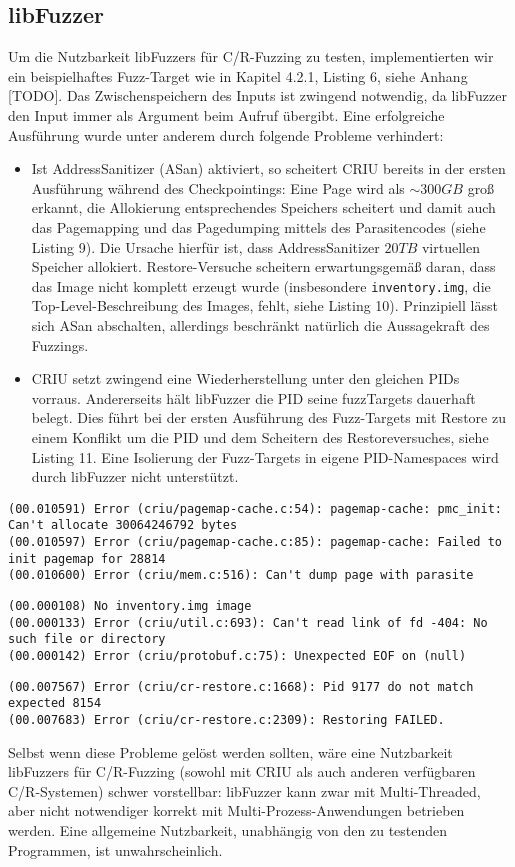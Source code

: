 \documentclass[a4paper]{article}
\begin{document}
\subsection{libFuzzer} %
Um die Nutzbarkeit libFuzzers für C/R-Fuzzing zu testen, implementierten wir ein beispielhaftes Fuzz-Target wie in Kapitel 4.2.1, Listing 6, siehe Anhang [TODO].
Das Zwischenspeichern des Inputs ist zwingend notwendig, da libFuzzer den Input immer als Argument beim Aufruf übergibt. 
Eine erfolgreiche Ausführung wurde unter anderem durch folgende Probleme verhindert:
\begin{itemize}
    \item Ist AddressSanitizer\cite{adsan} (ASan) aktiviert, so scheitert CRIU bereits in der ersten Ausführung während des Checkpointings: Eine Page wird als $\sim 300GB$ groß erkannt, die Allokierung entsprechendes Speichers scheitert und damit auch das Pagemapping und das Pagedumping mittels des Parasitencodes (siehe Listing 9). 
        Die Ursache hierfür ist, dass AddressSanitizer $20TB$ virtuellen Speicher allokiert\cite{aflasan}. Restore-Versuche scheitern erwartungsgemäß daran, dass das Image nicht komplett erzeugt wurde (insbesondere \texttt{inventory.img}, die Top-Level-Beschreibung des Images, fehlt, siehe Listing 10).
        Prinzipiell lässt sich ASan abschalten, allerdings beschränkt natürlich die Aussagekraft des Fuzzings.
    \item CRIU setzt zwingend eine Wiederherstellung unter den gleichen PIDs vorraus. Andererseits hält libFuzzer die PID seine fuzzTargets dauerhaft belegt. Dies führt bei der ersten Ausführung des Fuzz-Targets mit Restore zu einem Konflikt um die PID und dem Scheitern des Restoreversuches, siehe Listing 11. Eine Isolierung der Fuzz-Targets in eigene PID-Namespaces wird durch libFuzzer nicht unterstützt.
\end{itemize}
\begin{lstlisting}[caption=Pagemapping/dumping Errors mit ASan]
(00.010591) Error (criu/pagemap-cache.c:54): pagemap-cache: pmc_init: Can't allocate 30064246792 bytes
(00.010597) Error (criu/pagemap-cache.c:85): pagemap-cache: Failed to init pagemap for 28814
(00.010600) Error (criu/mem.c:516): Can't dump page with parasite
\end{lstlisting}
\begin{lstlisting}[caption=Restoring Error mit ASan]
(00.000108) No inventory.img image
(00.000133) Error (criu/util.c:693): Can't read link of fd -404: No such file or directory
(00.000142) Error (criu/protobuf.c:75): Unexpected EOF on (null)
\end{lstlisting}
\begin{lstlisting}[caption=Restoring Error durch PID mismatch]
(00.007567) Error (criu/cr-restore.c:1668): Pid 9177 do not match expected 8154
(00.007683) Error (criu/cr-restore.c:2309): Restoring FAILED.
\end{lstlisting}
Selbst wenn diese Probleme gelöst werden sollten, wäre eine Nutzbarkeit libFuzzers für C/R-Fuzzing (sowohl mit CRIU als auch anderen verfügbaren C/R-Systemen) schwer vorstellbar: libFuzzer kann zwar mit Multi-Threaded, aber nicht notwendiger korrekt mit Multi-Prozess-Anwendungen betrieben werden. Eine allgemeine Nutzbarkeit, unabhängig von den zu testenden Programmen, ist unwahrscheinlich.
\end{document}
